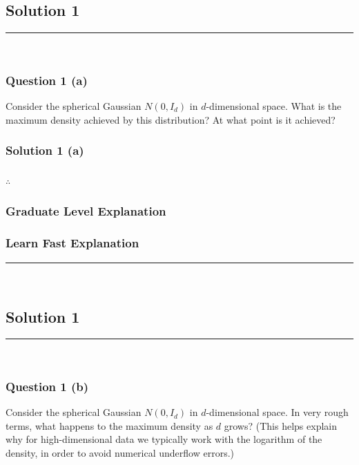 \documentclass{article}
\begin{document}
\pagestyle{fancy}

\subsection*{Solution 1}
\noindent\rule{\textwidth}{0.4pt}\\
\subsubsection*{Question 1 (a)}
\begin{flushleft}
    Consider the spherical Gaussian $N(0, I_d)$ in $d$-dimensional space. 
    What is the maximum density achieved by this distribution? At what point is it achieved? 
\end{flushleft}

\subsubsection*{Solution 1 (a)}

\subsubsection*{\normalfont}{$\therefore$ }

\subsubsection*{Graduate Level Explanation}

\subsubsection*{Learn Fast Explanation}

\noindent\rule{\textwidth}{0.4pt}\\

\newpage

\subsection*{Solution 1}
\noindent\rule{\textwidth}{0.4pt}\\
\subsubsection*{Question 1 (b)}
\begin{flushleft}
    Consider the spherical Gaussian $N(0, I_d)$ in $d$-dimensional space. 
    In very rough terms, what happens to the maximum density as $d$ grows? 
    (This helps explain why for high-dimensional data we typically work with the logarithm of the density, in order to avoid numerical underflow errors.) 
\end{flushleft}
\end{document}
